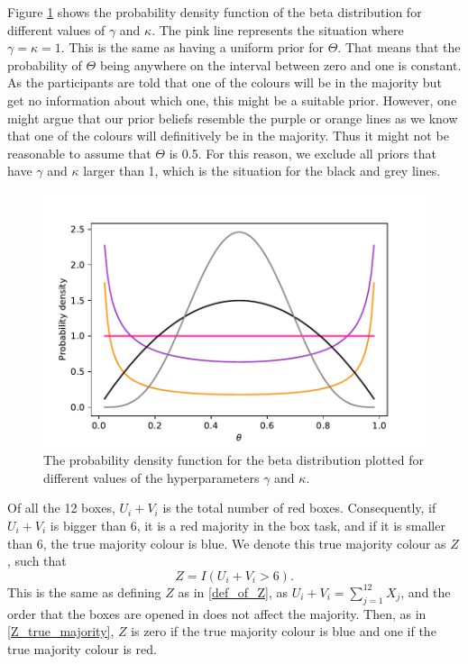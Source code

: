 Figure \ref{fig:pdf_beta_distr} shows the probability density function of the beta distribution for different values of $\gamma$ and $\kappa$. The pink line represents the situation where $\gamma=\kappa=1$. This is the same as having a uniform prior for $\Theta$. That means that the probability of $\Theta$ being anywhere on the interval between zero and one is constant. As the participants are told that one of the colours will be in the majority but get no information about which one, this might be a suitable prior.
However, one might argue that our prior beliefs resemble the purple or orange lines as we know that one of the colours will definitively be in the majority. Thus it might not be reasonable to assume that $\Theta$ is 0.5. For this reason, we exclude all priors that have $\gamma$ and $\kappa$ larger than 1, which is the situation for the black and grey lines. 

\begin{figure}
    \centering
    \includegraphics[scale=0.5]{pictures/beta_pdf.pdf}
    \caption[Probability Density for the Beta Distribution]{The probability density function for the beta distribution plotted for different values of the hyperparameters $\gamma$ and $\kappa$.
    }
    \label{fig:pdf_beta_distr}
\end{figure}


Of all the 12 boxes, $U_i+V_i$ is the total number of red boxes.
Consequently, if $U_i+V_i$ is bigger than 6, it is a red majority in the box task, and if it is smaller than 6, the true majority colour is blue. We denote this true majority colour as $Z$, such that
\begin{equation}
\label{def_of_Z_2}
    Z = I(U_i+V_i>6).
\end{equation}
This is the same as defining $Z$ as in \eqref{def_of_Z}, as $U_i+V_i = \sum_{j=1}^{12}X_j$, and the order that the boxes are opened in does not affect the majority. Then, as in \eqref{Z_true_majority}, $Z$ is zero if the true majority colour is blue and one if the true majority colour is red. 



